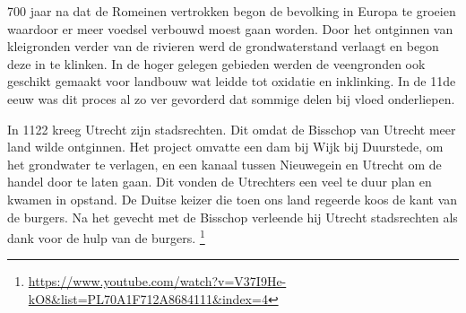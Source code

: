 700 jaar na dat de Romeinen vertrokken begon de bevolking in Europa te groeien waardoor er meer voedsel verbouwd moest gaan worden.
Door het ontginnen van kleigronden verder van de rivieren werd de grondwaterstand verlaagt en begon deze in te klinken.
In de hoger gelegen gebieden werden de veengronden ook geschikt gemaakt voor landbouw wat leidde tot oxidatie en inklinking.
In de 11de eeuw was dit proces al zo ver gevorderd dat sommige delen bij vloed onderliepen.

In 1122 kreeg Utrecht zijn stadsrechten.
Dit omdat de Bisschop van Utrecht meer land wilde ontginnen.
Het project omvatte een dam bij Wijk bij Duurstede, om het grondwater te verlagen,
en een kanaal tussen Nieuwegein en Utrecht om de handel door te laten gaan.
Dit vonden de Utrechters een veel te duur plan en kwamen in opstand.
De Duitse keizer die toen ons land regeerde koos de kant van de burgers.
Na het gevecht met de Bisschop verleende hij Utrecht stadsrechten als dank voor de hulp van de burgers.
\footnote{\url{https://www.youtube.com/watch?v=V37I9He-kO8&list=PL70A1F712A8684111&index=4}}



